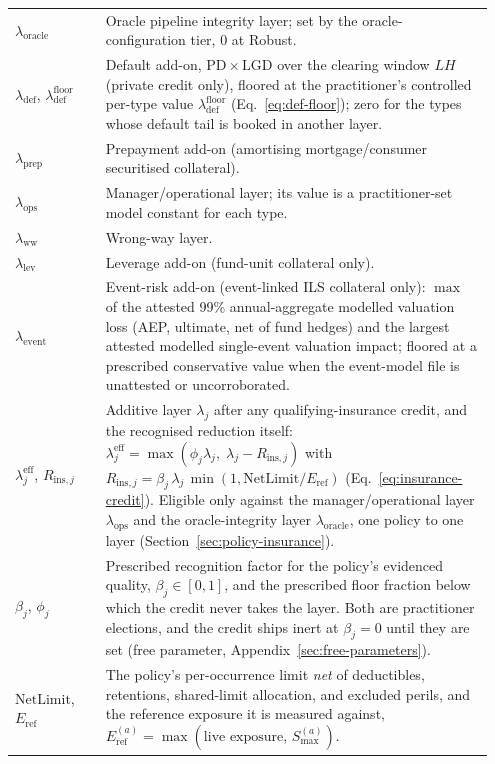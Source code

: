 \begin{longtable}{@{}p{0.18\linewidth} p{0.77\linewidth}@{}}
$\lambda_{\mathrm{oracle}}$ & Oracle pipeline integrity layer; set by the oracle-configuration tier, $0$ at Robust.\\
$\lambda_{\mathrm{def}}$, $\lambda^{\mathrm{floor}}_{\mathrm{def}}$ & Default add-on, $\mathrm{PD}\times\mathrm{LGD}$ over the clearing window $LH$ (private credit only), floored at the practitioner's controlled per-type value $\lambda^{\mathrm{floor}}_{\mathrm{def}}$ (Eq.~\eqref{eq:def-floor}); zero for the types whose default tail is booked in another layer.\\
$\lambda_{\mathrm{prep}}$ & Prepayment add-on (amortising mortgage/consumer securitised collateral).\\
$\lambda_{\mathrm{ops}}$ & Manager/operational layer; its value is a practitioner-set model constant for each type.\\
$\lambda_{\mathrm{ww}}$ & Wrong-way layer.\\
$\lambda_{\mathrm{lev}}$ & Leverage add-on (fund-unit collateral only).\\
$\lambda_{\mathrm{event}}$ & Event-risk add-on (event-linked ILS collateral only): $\max$ of the attested 99\% annual-aggregate modelled valuation loss (AEP, ultimate, net of fund hedges) and the largest attested modelled single-event valuation impact; floored at a prescribed conservative value when the event-model file is unattested or uncorroborated.\\
$\lambda_j^{\mathrm{eff}}$, $R_{\mathrm{ins},j}$ & Additive layer $\lambda_j$ after any qualifying-insurance credit, and the recognised reduction itself: $\lambda_j^{\mathrm{eff}} = \max(\phi_j\lambda_j,\;\lambda_j - R_{\mathrm{ins},j})$ with $R_{\mathrm{ins},j} = \beta_j\,\lambda_j\,\min(1,\mathrm{NetLimit}/E_{\mathrm{ref}})$ (Eq.~\eqref{eq:insurance-credit}). Eligible only against the manager/operational layer $\lambda_{\mathrm{ops}}$ and the oracle-integrity layer $\lambda_{\mathrm{oracle}}$, one policy to one layer (Section~\ref{sec:policy-insurance}).\\
$\beta_j$, $\phi_j$ & Prescribed recognition factor for the policy's evidenced quality, $\beta_j\in[0,1]$, and the prescribed floor fraction below which the credit never takes the layer. Both are practitioner elections, and the credit ships inert at $\beta_j=0$ until they are set (free parameter, Appendix~\ref{sec:free-parameters}).\\
$\mathrm{NetLimit}$, $E_{\mathrm{ref}}$ & The policy's per-occurrence limit \emph{net} of deductibles, retentions, shared-limit allocation, and excluded perils, and the reference exposure it is measured against, $E_{\mathrm{ref}}^{(a)}=\max(\text{live exposure},\,S_{\max}^{(a)})$.\\

\end{longtable}
